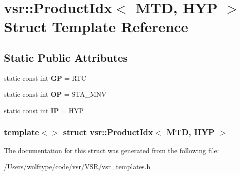 \hypertarget{structvsr_1_1_product_idx_3_01_m_t_d_00_01_h_y_p_01_4}{\section{vsr\-:\-:Product\-Idx$<$ M\-T\-D, H\-Y\-P $>$ Struct Template Reference}
\label{structvsr_1_1_product_idx_3_01_m_t_d_00_01_h_y_p_01_4}
}
\subsection*{Static Public Attributes}
\begin{DoxyCompactItemize}
\item 
\hypertarget{structvsr_1_1_product_idx_3_01_m_t_d_00_01_h_y_p_01_4_a41b50144433b67bb7b179f12195afd2d}{static const int {\bfseries G\-P} = R\-T\-C}\label{structvsr_1_1_product_idx_3_01_m_t_d_00_01_h_y_p_01_4_a41b50144433b67bb7b179f12195afd2d}

\item 
\hypertarget{structvsr_1_1_product_idx_3_01_m_t_d_00_01_h_y_p_01_4_a302dfd89aadeaf21babe58beb24e3c7e}{static const int {\bfseries O\-P} = S\-T\-A\-\_\-\-M\-N\-V}\label{structvsr_1_1_product_idx_3_01_m_t_d_00_01_h_y_p_01_4_a302dfd89aadeaf21babe58beb24e3c7e}

\item 
\hypertarget{structvsr_1_1_product_idx_3_01_m_t_d_00_01_h_y_p_01_4_aa5dcc272044eff62354a1bd8a05a1ff7}{static const int {\bfseries I\-P} = H\-Y\-P}\label{structvsr_1_1_product_idx_3_01_m_t_d_00_01_h_y_p_01_4_aa5dcc272044eff62354a1bd8a05a1ff7}

\end{DoxyCompactItemize}
\subsubsection*{template$<$$>$ struct vsr\-::\-Product\-Idx$<$ M\-T\-D, H\-Y\-P $>$}



The documentation for this struct was generated from the following file\-:\begin{DoxyCompactItemize}
\item 
/\-Users/wolftype/code/vsr/\-V\-S\-R/vsr\-\_\-templates.\-h\end{DoxyCompactItemize}
